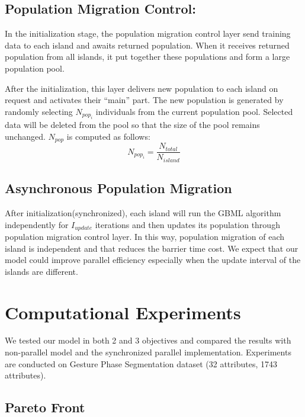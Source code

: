 \documentclass[conference]{IEEEtran}
\begin{document}
  \subsection{Population Migration Control:}
  In the initialization stage, the population migration control layer send training data to each island and awaits returned population. When it receives returned population from all islands, it put together these populations and form a large population pool. 
	
  After the initialization, this layer delivers new population to each island on request and activates their “main” part. The new population is generated by randomly selecting $ N_{pop_{i}}$ individuals from the current population pool. Selected data will be deleted from the pool so that the size of the pool remains unchanged. $N_{pop}$ is computed as follows:
  $$N_{pop_i} = \frac{N_{total}}{N_{island}}$$
	
  \subsection{Asynchronous Population Migration}
  After initialization(synchronized), each island will run the GBML algorithm independently for $I_{update}$ iterations and then updates its population through population migration control layer. In this way, population migration of each island is independent and that reduces the barrier time cost. We expect that our model could improve parallel efficiency especially when the update interval of the islands are different. 
  
  
  \section{Computational Experiments}

   We tested our model in both 2 and 3 objectives and compared the results with non-parallel model and the synchronized parallel implementation\cite{nojima2015application}. Experiments are conducted on Gesture Phase Segmentation dataset\cite{Gphase} (32 attributes, 1743 attributes).
   
  \subsection{Pareto Front}
\end{document}
